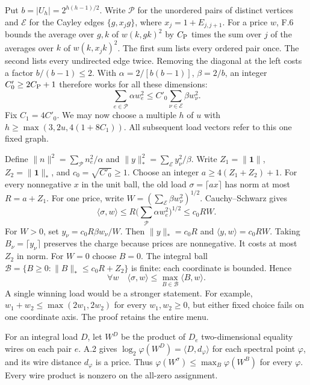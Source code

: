 \newpage
{}
Put $b=|U_h|=2^{h(h-1)/2}$. Write $\mathcal P$ for the unordered pairs of distinct vertices and $\mathcal E$ for the Cayley edges $\{g,x_jg\}$, where $x_j=1+E_{j,j+1}$. For a price $w$, F.6 bounds the average over $g,k$ of $w(k,gk)^2$ by $C_{\rm P}$ times the sum over $j$ of the averages over $k$ of $w(k,x_jk)^2$. The first sum lists every ordered pair once. The second lists every undirected edge twice. Removing the diagonal at the left costs a factor $b/(b-1)\le2$. With $\alpha=2/[b(b-1)]$, $\beta=2/b$, an integer $C'_0\ge2C_{\rm P}+1$ therefore works for all these dimensions:
\[
 \sum_{e\in\mathcal P}\alpha w_e^2\le C'_0\sum_{\nu\in\mathcal E}\beta w_\nu^2.
\]
Fix $C_1=4C'_0$. We may now choose a multiple $h$ of $u$ with $h\ge\max(3,2u,4(1+8C_1))$. All subsequent load vectors refer to this one fixed graph.

Define $\|n\|^2=\sum_{\mathcal P}n_e^2/\alpha$ and $\|y\|_*^2=\sum_{\mathcal E}y_\nu^2/\beta$. Write $Z_1=\|\mathbf1\|$, $Z_2=\|\mathbf1\|_*$, and $c_0=\sqrt{C'_0}\ge1$. Choose an integer $a\ge4(Z_1+Z_2)+1$. For every nonnegative $x$ in the unit ball, the old load $\sigma=\lceil ax\rceil$ has norm at most $R=a+Z_1$. For one price, write $W=(\sum_{\mathcal E}\beta w_\nu^2)^{1/2}$. Cauchy--Schwarz gives
\[
 \langle\sigma,w\rangle
 \le R\Big(\sum_{\mathcal P}\alpha w_e^2\Big)^{1/2}\le c_0 RW.
\]
For $W>0$, set $y_\nu=c_0 R\beta w_\nu/W$. Then $\|y\|_*=c_0R$ and $\langle y,w\rangle=c_0RW$. Taking $B_\nu=\lceil y_\nu\rceil$ preserves the charge because prices are nonnegative. It costs at most $Z_2$ in norm. For $W=0$ choose $B=0$. The integral ball $\mathcal B=\{B\ge0:\|B\|_*\le c_0R+Z_2\}$ is finite: each coordinate is bounded. Hence
\[
       \forall w\quad \langle\sigma,w\rangle\le
                \max_{B\in\mathcal B}\langle B,w\rangle .
\]
A single winning load would be a stronger statement. For example, $w_1+w_2\le\max(2w_1,2w_2)$ for every $w_1,w_2\ge0$, but either fixed choice fails on one coordinate axis. The proof retains the entire menu.


\newpage
{}
For an integral load $D$, let $W^D$ be the product of $D_e$ two-dimensional equality wires on each pair $e$. A.2 gives $\log_2\varphi(W^D)=\langle D,d_\varphi\rangle$ for each spectral point $\varphi$, and its wire distance $d_\varphi$ is a price. Thus $\varphi(W^\sigma)\le\max_B\varphi(W^B)$ for every $\varphi$. Every wire product is nonzero on the all-zero assignment.

